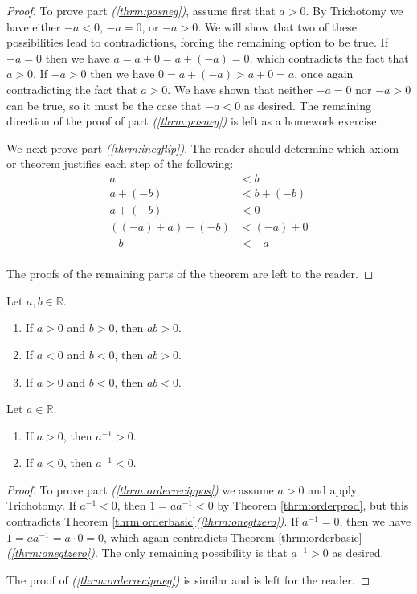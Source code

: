 \begin{proof}
To prove part {\itshape (\ref{thrm:posneg})}, assume first that $a>0$. By Trichotomy we have either $-a<0$, $-a=0$, or $-a>0$. We will show that two of these possibilities lead to contradictions, forcing the remaining option to be true. If $-a=0$ then we have $a=a+0=a+(-a)=0$, which contradicts the fact that $a>0$. If $-a>0$ then we have $0=a+(-a)>a+0=a$, once again contradicting the fact that $a>0$. We have shown that neither $-a=0$ nor $-a>0$ can be true, so it must be the case that $-a<0$ as desired. The remaining direction of the proof of part {\itshape (\ref{thrm:posneg})} is left as a homework exercise.

We next prove part {\itshape (\ref{thrm:ineqflip})}. The reader should determine which axiom or theorem justifies each step of the following:
\begin{equation*}
\begin{split}
a&<b\\
a+(-b)&<b+(-b)\\
a+(-b)&<0\\
((-a)+a)+(-b)&<(-a)+0\\
-b&<-a\\
\end{split}
\end{equation*}

The proofs of the remaining parts of the theorem are left to the reader.
\end{proof}

\begin{thrm} \label{thrm:orderprod}
Let $a,b\in\mathbb R$.
\begin{enumerate}
\item If $a>0$ and $b>0$, then $ab>0$.
\item If $a<0$ and $b<0$, then $ab>0$.
\item If $a>0$ and $b<0$, then $ab<0$.
\end{enumerate}
\end{thrm}

\begin{thrm} \label{thrm:orderrecip}
Let $a\in\mathbb R$.
\begin{enumerate}
\item If $a>0$, then $a^{-1}>0$. \label{thrm:orderrecippos}
\item If $a<0$, then $a^{-1}<0$. \label{thrm:orderrecipneg}
\end{enumerate}
\end{thrm}

\begin{proof}
To prove part {\itshape (\ref{thrm:orderrecippos})} we assume $a>0$ and apply Trichotomy. If $a^{-1}<0$, then $1=aa^{-1}<0$ by Theorem \ref{thrm:orderprod}, but this contradicts Theorem \ref{thrm:orderbasic}{\itshape (\ref{thrm:onegtzero})}. If $a^{-1}=0$, then we have $1=aa^{-1}=a\cdot0=0$, which again contradicts Theorem \ref{thrm:orderbasic}{\itshape (\ref{thrm:onegtzero})}. The only remaining possibility is that $a^{-1}>0$ as desired.

The proof of {\itshape (\ref{thrm:orderrecipneg})} is similar and is left for the reader.
\end{proof}

